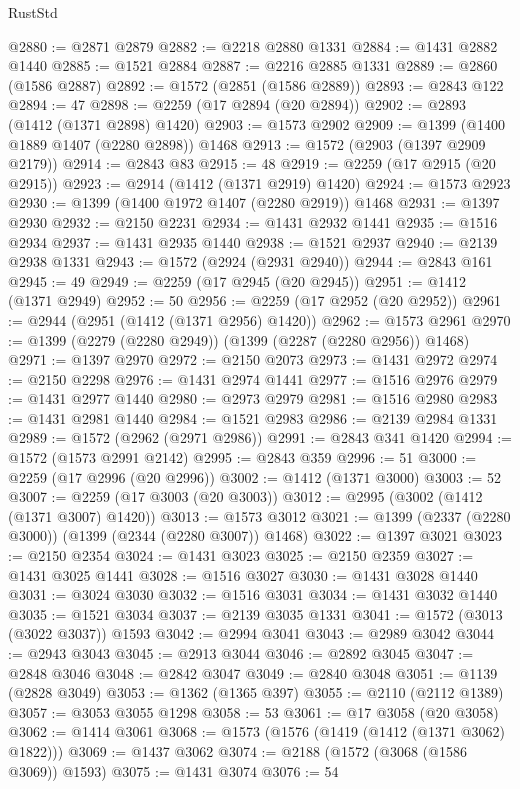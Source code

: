 \begin{lexlean}{RustStd}
\begin{coremodule}
@2880 := @2871 @2879
@2882 := @2218 @2880 @1331
@2884 := @1431 @2882 @1440
@2885 := @1521 @2884
@2887 := @2216 @2885 @1331
@2889 := @2860 (@1586 @2887)
@2892 := @1572 (@2851 (@1586 @2889))
@2893 := @2843 @122
@2894 := 47
@2898 := @2259 (@17 @2894 (@20 @2894))
@2902 := @2893 (@1412 (@1371 @2898) @1420)
@2903 := @1573 @2902
@2909 := @1399 (@1400 @1889 @1407 (@2280 @2898)) @1468
@2913 := @1572 (@2903 (@1397 @2909 @2179))
@2914 := @2843 @83
@2915 := 48
@2919 := @2259 (@17 @2915 (@20 @2915))
@2923 := @2914 (@1412 (@1371 @2919) @1420)
@2924 := @1573 @2923
@2930 := @1399 (@1400 @1972 @1407 (@2280 @2919)) @1468
@2931 := @1397 @2930
@2932 := @2150 @2231
@2934 := @1431 @2932 @1441
@2935 := @1516 @2934
@2937 := @1431 @2935 @1440
@2938 := @1521 @2937
@2940 := @2139 @2938 @1331
@2943 := @1572 (@2924 (@2931 @2940))
@2944 := @2843 @161
@2945 := 49
@2949 := @2259 (@17 @2945 (@20 @2945))
@2951 := @1412 (@1371 @2949)
@2952 := 50
@2956 := @2259 (@17 @2952 (@20 @2952))
@2961 := @2944 (@2951 (@1412 (@1371 @2956) @1420))
@2962 := @1573 @2961
@2970 := @1399 (@2279 (@2280 @2949)) (@1399 (@2287 (@2280 @2956)) @1468)
@2971 := @1397 @2970
@2972 := @2150 @2073
@2973 := @1431 @2972
@2974 := @2150 @2298
@2976 := @1431 @2974 @1441
@2977 := @1516 @2976
@2979 := @1431 @2977 @1440
@2980 := @2973 @2979
@2981 := @1516 @2980
@2983 := @1431 @2981 @1440
@2984 := @1521 @2983
@2986 := @2139 @2984 @1331
@2989 := @1572 (@2962 (@2971 @2986))
@2991 := @2843 @341 @1420
@2994 := @1572 (@1573 @2991 @2142)
@2995 := @2843 @359
@2996 := 51
@3000 := @2259 (@17 @2996 (@20 @2996))
@3002 := @1412 (@1371 @3000)
@3003 := 52
@3007 := @2259 (@17 @3003 (@20 @3003))
@3012 := @2995 (@3002 (@1412 (@1371 @3007) @1420))
@3013 := @1573 @3012
@3021 := @1399 (@2337 (@2280 @3000)) (@1399 (@2344 (@2280 @3007)) @1468)
@3022 := @1397 @3021
@3023 := @2150 @2354
@3024 := @1431 @3023
@3025 := @2150 @2359
@3027 := @1431 @3025 @1441
@3028 := @1516 @3027
@3030 := @1431 @3028 @1440
@3031 := @3024 @3030
@3032 := @1516 @3031
@3034 := @1431 @3032 @1440
@3035 := @1521 @3034
@3037 := @2139 @3035 @1331
@3041 := @1572 (@3013 (@3022 @3037)) @1593
@3042 := @2994 @3041
@3043 := @2989 @3042
@3044 := @2943 @3043
@3045 := @2913 @3044
@3046 := @2892 @3045
@3047 := @2848 @3046
@3048 := @2842 @3047
@3049 := @2840 @3048
@3051 := @1139 (@2828 @3049)
@3053 := @1362 (@1365 @397)
@3055 := @2110 (@2112 @1389)
@3057 := @3053 @3055 @1298
@3058 := 53
@3061 := @17 @3058 (@20 @3058)
@3062 := @1414 @3061
@3068 := @1573 (@1576 (@1419 (@1412 (@1371 @3062) @1822)))
@3069 := @1437 @3062
@3074 := @2188 (@1572 (@3068 (@1586 @3069)) @1593)
@3075 := @1431 @3074
@3076 := 54

\end{coremodule}
\end{lexlean}
